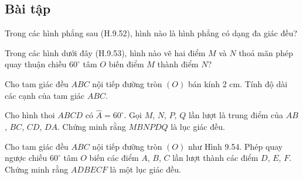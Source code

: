 \begin{exercises}
    \subsection{Bài tập}

    \begin{questions}[resume=SGK]
        \item Trong các hình phẳng sau (H.9.52), hình nào là hình phẳng có dạng đa giác đều?


        \answerline

        \item Trong các hình dưới đây (H.9.53), hình nào vẽ hai điểm $M$ và $N$ thoả mãn phép quay thuận chiều $60^\circ$ tâm $O$ biến điểm $M$ thành điểm $N$?


        \answerline

        \item Cho tam giác đều $ABC$ nội tiếp đường tròn $(O)$ bán kính 2 cm. Tính độ dài các cạnh của tam giác $ABC$.

        \answerline
        \answerline

        \item Cho hình thoi $ABCD$ có $\widehat A=60^\circ$. Gọi $M$, $N$, $P$, $Q$ lần lượt là trung điểm của $AB$, $BC$, $CD$, $DA$. Chứng minh rằng $MBNPDQ$ là lục giác đều.

        \answerline
        \answerline
        \answerline

        \item Cho tam giác đều $ABC$ nội tiếp đường tròn $(O)$ như Hình 9.54. Phép quay ngược chiều $60^\circ$ tâm $O$ biến các điểm $A$, $B$, $C$ lần lượt thành các điểm $D$, $E$, $F$. Chứng minh rằng $ADBECF$ là một lục giác đều.

        \begin{center}


\end{center}
\end{questions}
\end{exercises}
